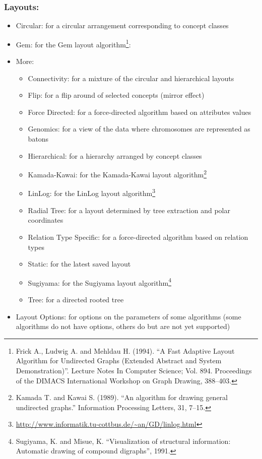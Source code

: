 \subsubsection{Layouts:}
\begin{itemize}
\item Circular:
for a circular arrangement corresponding to concept classes
\item Gem:
for the Gem layout algorithm\footnote{
Frick A., Ludwig A. and Mehldau H. (1994). ``A Fast Adaptive Layout Algorithm for Undirected Graphs (Extended Abstract and System Demonstration)''. 
Lecture Notes In Computer Science; Vol. 894. Proceedings of the DIMACS International Workshop on Graph Drawing, 388--403.}:
\item More:
  \begin{itemize}
  \item Connectivity:
  for a mixture of the circular and hierarchical layouts
  \item Flip:
  for a flip around of selected concepts (mirror effect)
  \item Force Directed:
  for a force-directed algorithm based on attributes values
  \item Genomics:
  for a view of the data where chromosomes are represented as batons
  \item Hierarchical:
  for a hierarchy arranged by concept classes
  \item Kamada-Kawai:
  for the Kamada-Kawai layout algorithm\footnote{Kamada T. and Kawai S. (1989). ``An algorithm for drawing general undirected graphs.'' Information Processing Letters, 31, 7--15.}
  \item LinLog:
  for the LinLog layout algorithm\footnote{\url{http://www.informatik.tu-cottbus.de/~an/GD/linlog.html}}
  \item Radial Tree:
  for a layout determined by tree extraction and polar coordinates
  \item Relation Type Specific:
  for a force-directed algorithm based on relation types
  \item Static:
  for the latest saved layout
  \item Sugiyama:
  for the Sugiyama layout algorithm\footnote{Sugiyama, K. and Misue, K. ``Visualization of structural information: Automatic drawing of compound digraphs'', 1991.}
  \item Tree:
  for a directed rooted tree
  \end{itemize}
\item Layout Options:
for options on the parameters of some algorithms (some algorithms do not have options, others do but are not yet supported)
\end{itemize}


